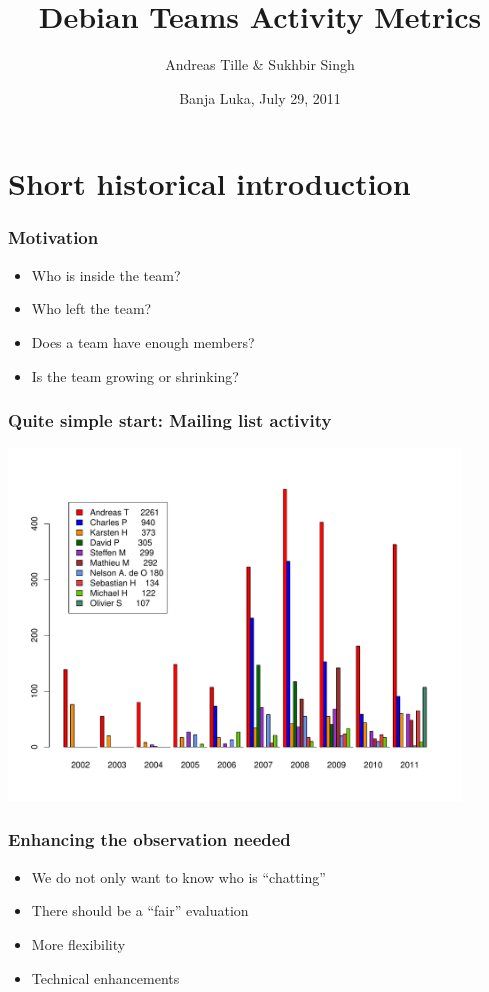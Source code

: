 \documentclass[compress]{beamer}
\title{Debian Teams Activity Metrics}
\author{Andreas Tille \& Sukhbir Singh}
\institute{\link{http://www.debconf.org/debconf11/}{DebConf 11}}
\date{Banja Luka, July 29, 2011}
\begin{document}
\begin{frame}
  \titlepage
\end{frame}

\section{Short historical introduction}

\begin{frame}
  \frametitle{Motivation}

  \begin{itemize}
     \item Who is inside the team?
     \item Who left the team?
     \item Does a team have enough members?
     \item Is the team growing or shrinking?
  \end{itemize}
\end{frame}

\begin{frame}
  \frametitle{Quite simple start: Mailing list activity}
      \begin{center}
        \includegraphics[width=0.9\textwidth]{authorstat_med}
      \end{center}

\end{frame}

\begin{frame}
  \frametitle{Enhancing the observation needed}
  \begin{itemize}
    \item We do not only want to know who is ``chatting''
    \item There should be a ``fair'' evaluation
    \item More flexibility
    \item Technical enhancements
  \end{itemize}
\end{frame}
\end{document}
